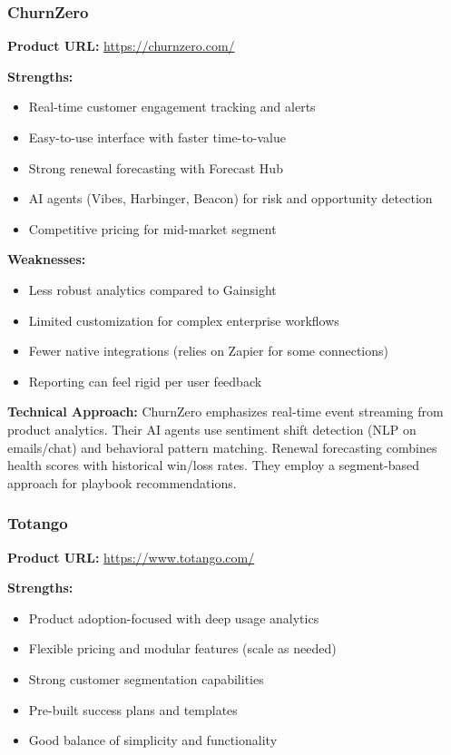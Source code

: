 \documentclass[12pt,a4paper]{article}
\begin{document}
\subsubsection{ChurnZero}
\textbf{Product URL:} \url{https://churnzero.com/}

\textbf{Strengths:}
\begin{itemize}
    \item Real-time customer engagement tracking and alerts
    \item Easy-to-use interface with faster time-to-value
    \item Strong renewal forecasting with Forecast Hub
    \item AI agents (Vibes, Harbinger, Beacon) for risk and opportunity detection
    \item Competitive pricing for mid-market segment
\end{itemize}

\textbf{Weaknesses:}
\begin{itemize}
    \item Less robust analytics compared to Gainsight
    \item Limited customization for complex enterprise workflows
    \item Fewer native integrations (relies on Zapier for some connections)
    \item Reporting can feel rigid per user feedback
\end{itemize}

\textbf{Technical Approach:} ChurnZero emphasizes real-time event streaming from product analytics. Their AI agents use sentiment shift detection (NLP on emails/chat) and behavioral pattern matching. Renewal forecasting combines health scores with historical win/loss rates. They employ a segment-based approach for playbook recommendations.

\subsubsection{Totango}
\textbf{Product URL:} \url{https://www.totango.com/}

\textbf{Strengths:}
\begin{itemize}
    \item Product adoption-focused with deep usage analytics
    \item Flexible pricing and modular features (scale as needed)
    \item Strong customer segmentation capabilities
    \item Pre-built success plans and templates
    \item Good balance of simplicity and functionality
\end{itemize}
\end{document}
